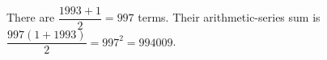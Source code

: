 There are $\dfrac{1993+1}{2}=997$ terms. Their arithmetic-series sum is $\dfrac{997(1+1993)}{2}=997^2=\boxed{994009}$.
